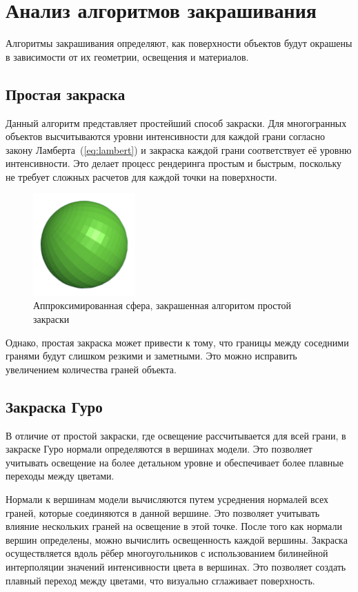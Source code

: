 \section{Анализ алгоритмов закрашивания}

Алгоритмы закрашивания определяют, как поверхности объектов будут окрашены в зависимости от их геометрии, освещения и материалов.

\subsection{Простая закраска}

Данный алгоритм представляет простейший способ закраски. Для многогранных объектов высчитываются уровни интенсивности для каждой грани согласно закону Ламберта~(\ref{eq:lambert}) и закраска каждой грани соответствует её уровню интенсивности. Это делает процесс рендеринга простым и быстрым, поскольку не требует сложных расчетов для каждой точки на поверхности.

\begin{figure}[h] 
	\centering
	\includegraphics[width=0.35\textwidth]{images/simple-shading.png}
	\caption{Аппроксимированная сфера, закрашенная алгоритом простой закраски} 
	\label{fig:simple-shading} 
\end{figure}

Однако, простая закраска может привести к тому, что границы между соседними гранями будут слишком резкими и заметными. Это можно исправить увеличением количества граней объекта. 

\subsection{Закраска Гуро}

В отличие от простой закраски, где освещение рассчитывается для всей грани, в закраске Гуро нормали определяются в вершинах модели. Это позволяет учитывать освещение на более детальном уровне и обеспечивает более плавные переходы между цветами.

Нормали к вершинам модели вычисляются путем усреднения нормалей всех граней, которые соединяются в данной вершине. Это позволяет учитывать влияние нескольких граней на освещение в этой точке. После того как нормали вершин определены, можно вычислить освещенность каждой вершины. Закраска осуществляется вдоль рёбер многоугольников с использованием билинейной интерполяции значений интенсивности цвета в вершинах. Это позволяет создать плавный переход между цветами, что визуально сглаживает поверхность.

